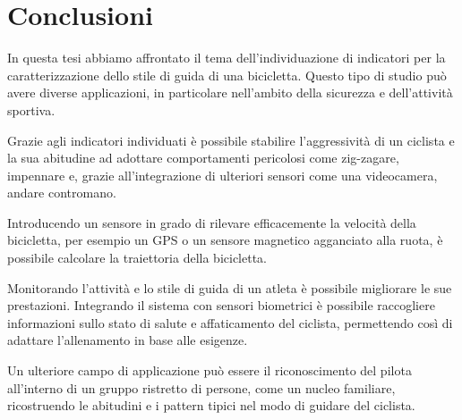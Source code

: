 \documentclass[class=article]{standalone}
\begin{document}
	\section{Conclusioni}
	In questa tesi abbiamo affrontato il tema dell'individuazione di indicatori per la caratterizzazione dello stile di guida di una bicicletta. Questo tipo di studio può avere diverse applicazioni, in particolare nell'ambito della sicurezza e dell'attività sportiva.\hfill\break
	
	Grazie agli indicatori individuati è possibile stabilire l'aggressività di un ciclista e la sua abitudine ad adottare comportamenti pericolosi come zig-zagare, impennare e, grazie all'integrazione di ulteriori sensori come una videocamera, andare contromano.
	
	Introducendo un sensore in grado di rilevare efficacemente la velocità della bicicletta, per esempio un GPS o un sensore magnetico agganciato alla ruota, è possibile calcolare la traiettoria della bicicletta.
	
	Monitorando l'attività e lo stile di guida di un atleta è possibile migliorare le sue prestazioni. Integrando il sistema con sensori biometrici è possibile raccogliere informazioni sullo stato di salute e affaticamento del ciclista, permettendo così di adattare l'allenamento in base alle esigenze.
	
	Un ulteriore campo di applicazione può essere il riconoscimento del pilota all'interno di un gruppo ristretto di persone, come un nucleo familiare, ricostruendo le abitudini e i pattern tipici nel modo di guidare del ciclista.
\end{document}
